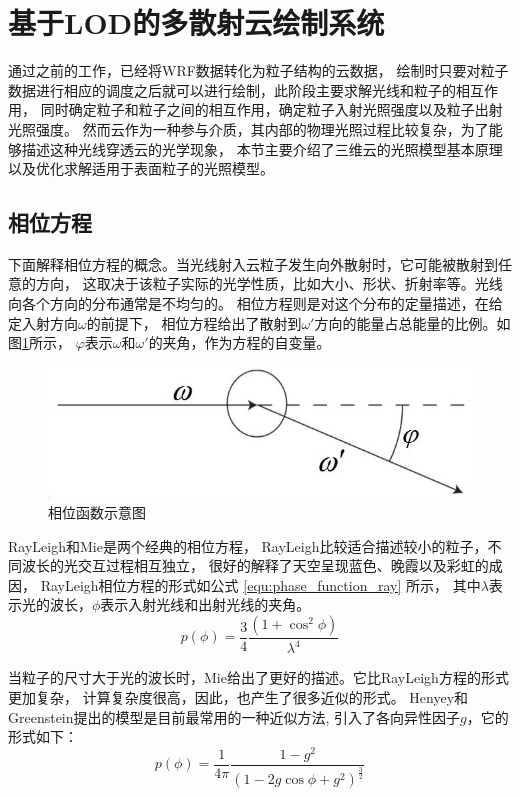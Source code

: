 \section{基于LOD的多散射云绘制系统}

通过之前的工作，已经将WRF数据转化为粒子结构的云数据，
绘制时只要对粒子数据进行相应的调度之后就可以进行绘制，此阶段主要求解光线和粒子的相互作用，
同时确定粒子和粒子之间的相互作用，确定粒子入射光照强度以及粒子出射光照强度。
然而云作为一种参与介质，其内部的物理光照过程比较复杂，为了能够描述这种光线穿透云的光学现象，
本节主要介绍了三维云的光照模型基本原理以及优化求解适用于表面粒子的光照模型。

\subsection{相位方程}

下面解释相位方程的概念。当光线射入云粒子发生向外散射时，它可能被散射到任意的方向，
这取决于该粒子实际的光学性质，比如大小、形状、折射率等。光线向各个方向的分布通常是不均匀的。
相位方程则是对这个分布的定量描述，在给定入射方向$\omega$的前提下，
相位方程给出了散射到$\omega'$方向的能量占总能量的比例。如图\ref{fig:phase_function}所示，
$\varphi$表示$\omega$和$\omega'$的夹角，作为方程的自变量。
\begin{figure}
	\centering
	\includegraphics{figure/phase_function.jpg}
	\caption{相位函数示意图}
	\label{fig:phase_function}
\end{figure}

RayLeigh和Mie是两个经典的相位方程，
RayLeigh比较适合描述较小的粒子，不同波长的光交互过程相互独立，
很好的解释了天空呈现蓝色、晚霞以及彩虹的成因，
RayLeigh相位方程的形式如公式 \ref{equ:phase_function_ray} 所示，
其中$\lambda$表示光的波长，$\phi$表示入射光线和出射光线的夹角。
\begin{equation}
	\label{equ:phase_function_ray}
	p(\phi) = \frac{3}{4}\frac{(1+\cos^{2}\phi)}{\lambda^{4}}
\end{equation}

当粒子的尺寸大于光的波长时，Mie给出了更好的描述。它比RayLeigh方程的形式更加复杂，
计算复杂度很高，因此，也产生了很多近似的形式。
Henyey和Greenstein提出的模型是目前最常用的一种近似方法,
引入了各向异性因子$g$，它的形式如下：
\begin{equation}
	\label{equ:phase_function_henyey}
	p(\phi) = \frac{1}{4\pi}\frac{1-g^2}{(1-2g\cos\phi +g^2)^{\frac{3}{2}}}
\end{equation}

